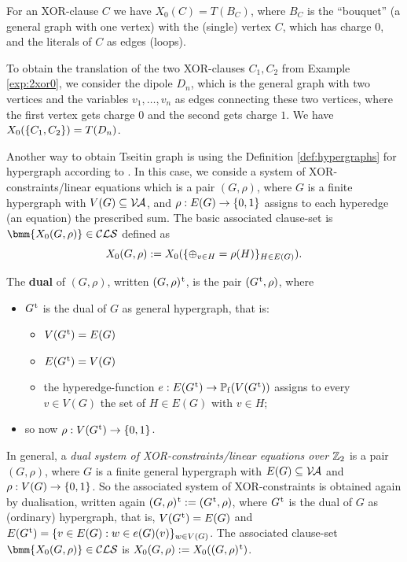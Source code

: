 \documentclass[12pt]{book}
\begin{document}
\begin{examp}\label{exp:2xor0T}
  \cite{h8} For an XOR-clause $C$ we have $X_0(C) = T(B_C)$, where $B_C$ is the ``bouquet'' (a general graph with one vertex) with the (single) vertex 
  $C$, which has charge $0$, and the literals of $C$ as edges (loops).

  To obtain the translation of the two XOR-clauses $C_1, C_2$ from Example \ref{exp:2xor0}, we consider the dipole $D_n$, which is the general 
  graph with two vertices and the variables $v_1,\dots,v_n$ as edges connecting these two vertices, where the first vertex gets charge $0$ and 
  the second gets charge $1$. We have $X_0(\{ C_1,C_2 \}) = T(D_n)$.
\end{examp}
Another way to obtain Tseitin graph is using the Definition \ref{def:hypergraphs} for hypergraph according to \cite{h5}. 
In this case, we conside a system of XOR-constraints/linear equations which is a pair $(G,\rho)$, where $G$ is a finite hypergraph with 
$V(G) \subseteq \mathcal{V\hspace{-0.1em}A}$, and $\rho: E(G) \rightarrow \{ 0,1 \}$ assigns to each hyperedge (an equation) the prescribed sum. The basic associated 
clause-set is $\bmm{X_0(G,\rho)} \in \Cls$ defined as
\begin{displaymath}
  X_0(G,\rho) := X_0(\{ \oplus_{v \in H} = \rho(H) \}_{H \in E(G)}).
\end{displaymath}

The \textbf{dual} of $(G,\rho)$, written $(G,\rho)^{\hspace{0.05em}\mathrm{t}}$, is the pair $(G^{\hspace{0.05em}\mathrm{t}}, \rho)$, where
\begin{itemize}
\item $G^{\hspace{0.05em}\mathrm{t}}$ is the dual of $G$ as general hypergraph, that is:
  \begin{itemize}
  \item $V(G^{\hspace{0.05em}\mathrm{t}}) = E(G)$
  \item $E(G^{\hspace{0.05em}\mathrm{t}}) = V(G)$
  \item the hyperedge-function $e: E(G^{\hspace{0.05em}\mathrm{t}}) \rightarrow \operatorname{\mathbb{P}_f}(V(G^{\hspace{0.05em}\mathrm{t}}))$ assigns to every $v \in V(G)$ the set of $H \in E(G)$ with $v \in H$;
  \end{itemize}
\item so now $\rho: V(G^{\hspace{0.05em}\mathrm{t}}) \rightarrow \{ 0,1 \}$.
\end{itemize}
In general, a \emph{dual system of XOR-constraints/linear equations over $\mathbb{Z}_2$} is a pair $(G,\rho)$, where $G$ is a finite general hypergraph 
with $E(G) \subseteq \mathcal{V\hspace{-0.1em}A}$ and $\rho: V(G) \rightarrow \{ 0,1 \}$. So the associated system of XOR-constraints is obtained again by dualisation, written again 
$(G,\rho)^{\hspace{0.05em}\mathrm{t}} := (G^{\hspace{0.05em}\mathrm{t}},\rho)$, where $G^{\hspace{0.05em}\mathrm{t}}$ is the dual of $G$ as (ordinary) hypergraph, that is, $V(G^{\hspace{0.05em}\mathrm{t}}) = E(G)$ and $E(G^{\hspace{0.05em}\mathrm{t}}) = \{ v \in E(G) : w \in e(G)(v) \}_{w \in V(G)}$. 
The associated clause-set $\bmm{X_0(G,\rho)} \in \Cls$ is $X_0(G,\rho) := X_0((G,\rho)^{\hspace{0.05em}\mathrm{t}})$.
\end{document}
